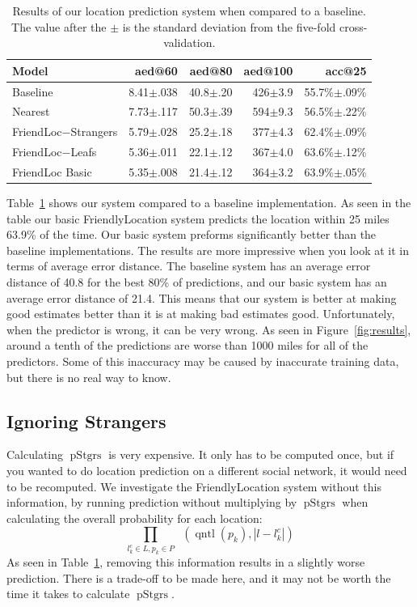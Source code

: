 \documentclass{sig-alternate}
\DeclareMathOperator{\pContact}{p^\ast}
\DeclareMathOperator{\pStrangers}{pStgrs}
\DeclareMathOperator{\quantile}{qntl}
\begin{document}
\begin{table}[tb]
\scriptsize
\centering
\begin{tabular}{l  r r r r}
    Model & aed@60 & aed@80 & aed@100 & acc@25 \\
    \hline
    Baseline & 8.41$\pm$.038 & 40.8$\pm$.20 & 426$\pm$3.9 & 55.7\%$\pm$.09\% \\
    Nearest & 7.73$\pm$.117 & 50.3$\pm$.39 & 594$\pm$9.3 & 56.5\%$\pm$.22\% \\
    FriendLoc$-$Strangers & 5.79$\pm$.028 & 25.2$\pm$.18 & 377$\pm$4.3 & 62.4\%$\pm$.09\% \\
    FriendLoc$-$Leafs & 5.36$\pm$.011 & 22.1$\pm$.12 & 367$\pm$4.0 & 63.6\%$\pm$.12\% \\
    FriendLoc Basic & 5.35$\pm$.008 & 21.4$\pm$.12 & 364$\pm$3.2 & 63.9\%$\pm$.05\% \\
\end{tabular}
\caption{
    Results of our location prediction system when compared to a baseline.
    The value after the $\pm$ is the standard deviation from the five-fold
    cross-validation.
}
\label{tab:results}
\end{table}



Table~\ref{tab:results} shows our system compared to a baseline implementation.
%
As seen in the table our basic FriendlyLocation system predicts the location
within 25 miles 63.9\% of the time.
%
Our basic system preforms significantly better than the baseline implementations.
%
The results are more impressive when you look at it in terms of average error
distance.
%
The baseline system has an average error distance of 40.8 for the best 80\% of
predictions, and our basic system has an average error distance of 21.4.
%
This means that our system is better at making good estimates better than it is
at making bad estimates good.
%
Unfortunately, when the predictor is wrong, it can be very wrong.
%
As seen in Figure~\ref{fig:results}, around a tenth of the predictions are worse
than 1000 miles for all of the predictors.
%
Some of this inaccuracy may be caused by inaccurate training data, but there is
no real way to know.





\subsection{Ignoring Strangers}
Calculating $\pStrangers$ is very expensive.
%
It only has to be computed once, but if you wanted to do location prediction on
a different social network, it would need to be recomputed.
%
We investigate the FriendlyLocation system without this information, by running
prediction without multiplying by $\pStrangers$ when calculating the overall
probability for each location:
\[
    \prod_{l^c_k \in L,p_k \in P} \pContact(\quantile(p_k),|l-l^c_k|)
\]
As seen in Table~\ref{tab:results}, removing this information results in a
slightly worse prediction.
%
There is a trade-off to be made here, and it may not be worth the time it takes
to calculate $\pStrangers$.
\end{document}
